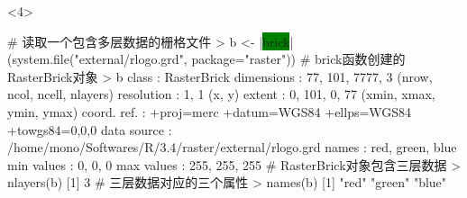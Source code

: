 \begin{frame}[t,fragile]{\subsecname}{\subsubsecname}
\begin{overlayarea}{\textwidth}{\textheight}
\begin{onlyenv}<4>
\begin{rcode}
# 读取一个包含多层数据的栅格文件
> b <- |\colorbox{green}{brick}|(system.file("external/rlogo.grd", package="raster"))
# brick函数创建的RasterBrick对象
> b
class       : RasterBrick 
dimensions  : 77, 101, 7777, 3  (nrow, ncol, ncell, nlayers)
resolution  : 1, 1  (x, y)
extent      : 0, 101, 0, 77  (xmin, xmax, ymin, ymax)
coord. ref. : +proj=merc +datum=WGS84 +ellps=WGS84 +towgs84=0,0,0 
data source : /home/mono/Softwares/R/3.4/raster/external/rlogo.grd 
names       : red, green, blue 
min values  :   0,     0,    0 
max values  : 255,   255,  255 
# RasterBrick对象包含三层数据
> nlayers(b)
[1] 3
# 三层数据对应的三个属性
> names(b)
[1] "red"   "green" "blue" 
\end{rcode}
\end{onlyenv}
\end{overlayarea}
\end{frame}

